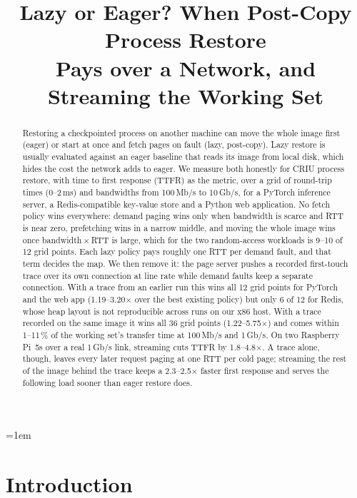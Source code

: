 \documentclass[conference]{IEEEtran}
\title{Lazy or Eager? When Post-Copy Process Restore\\
Pays over a Network, and Streaming the Working Set}
\author{\IEEEauthorblockN{Utkarsh Maurya}
\IEEEauthorblockA{Independent Researcher\\
\href{mailto:utkarsh@kernex.sbs}{utkarsh@kernex.sbs}}}
\begin{document}
\emergencystretch=1em
\maketitle

\begin{abstract}
Restoring a checkpointed process on another machine can move the whole
image first (eager) or start at once and fetch pages on fault (lazy,
post-copy). Lazy restore is usually evaluated against an eager baseline that
reads its image from local disk, which hides the cost the network adds to
eager. We measure both honestly for CRIU process restore, with time to first
response (TTFR) as the metric, over a grid of round-trip times (0--2\,ms)
and bandwidths from 100\,Mb/s to 10\,Gb/s, for a PyTorch inference server, a
Redis-compatible key-value store and a Python web application. No fetch
policy wins everywhere: demand paging wins only when bandwidth is scarce and
RTT is near zero, prefetching wins in a narrow middle, and moving the whole
image wins once bandwidth${}\times{}$RTT is large, which for the two
random-access workloads is 9--10 of 12 grid points. Each lazy policy pays
roughly one RTT per demand fault, and that term decides the map. We then
remove it: the page server pushes a recorded first-touch trace over its own
connection at line rate while demand faults keep a separate connection.
With a trace from an earlier run this wins all 12 grid points for PyTorch
and the web app (1.19--3.20$\times$ over the best existing policy) but only
6 of 12 for Redis, whose heap layout is not reproducible across runs on our
x86 host. With a trace recorded on the same image it wins all 36 grid points
(1.22--5.75$\times$) and comes within 1--11\,\% of the working set's
transfer time at 100\,Mb/s and 1\,Gb/s. On two Raspberry Pi~5s over a real
1\,Gb/s link, streaming cuts TTFR by 1.8--4.8$\times$. A trace alone,
though, leaves every later request paging at one RTT per cold page;
streaming the rest of the image behind the trace keeps a 2.3--2.5$\times$
faster first response and serves the following load sooner than eager
restore does.
\end{abstract}

\section{Introduction}
\end{document}
